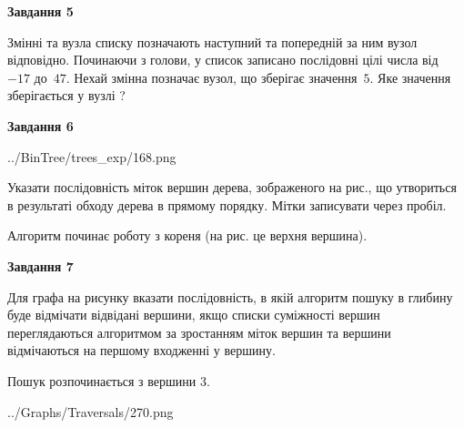 \documentclass[12pt, ukrainian]{article}
\begin{document}
{\begin {large}
{\begin {center}\textbf{Завдання 5}\end {center}}\par
Змінні  та  вузла списку позначають наступний та попередній за ним вузол відповідно. Починаючи з голови, у список записано послідовні цілі числа від~$-17$ до~$47$. Нехай змінна  позначає вузол, що зберігає значення~$5$.
Яке значення зберігається у вузлі  ?\par
\newpage

{\begin {center}\textbf{Завдання 6}\end {center}}\par

\begin{center}
	{../BinTree/trees_exp/168.png}
\end{center}
Указати послідовність міток вершин дерева, зображеного на рис., що утвориться в результаті обходу дерева в прямому порядку. Мітки записувати через пробіл.\par Алгоритм починає роботу з кореня (на рис. це верхня вершина).\par
\newpage

{\begin {center}\textbf{Завдання 7}\end {center}}\par
Для графа на рисунку вказати послідовність, в якій алгоритм пошуку в глибину буде відмічати відвідані вершини, якщо списки суміжності вершин переглядаються алгоритмом за зростанням міток вершин та вершини відмічаються на першому вход\-женні у вершину.\par
Пошук розпочинається з вершини 3.\par

\begin{center}
	{../Graphs/Traversals/270.png}
\end{center}\par
\newpage


\end{large}}
\end{document}
